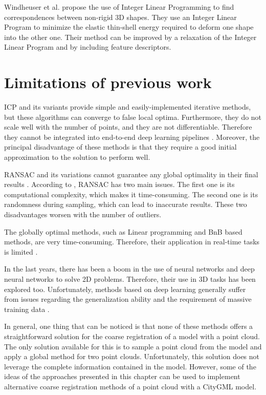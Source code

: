     Windheuser et al. \cite{Windheuser_2011_largescale} propose the use of Integer Linear Programming to find correspondences between non-rigid 3D shapes.
    They use an Integer Linear Program to minimize the elastic thin-shell energy required to deform one shape into the other one.
    Their method can be improved by a relaxation of the Integer Linear Program and by including feature descriptors.

    \section{Limitations of previous work} 

    ICP and its variants provide simple and easily-implemented iterative methods, but these algorithms can converge to false local optima.
    Furthermore, they do not scale well with the number of points, and they are not differentiable. 
    Therefore they cannot be integrated into end-to-end deep learning pipelines \cite{Sarode_2019_oneframework}. 
    Moreover, the principal disadvantage of these methods is that they require a good initial approximation to the solution to perform well.
    
    RANSAC and its variations cannot guarantee any global optimality in their final results \cite{Bazin_2013_abranchandbound}.
    According to \cite{Quan_2020_com}, RANSAC has two main issues. 
    The first one is its computational complexity, which makes it time-consuming.
    The second one is its randomness during sampling, which can lead to inaccurate results.
    These two disadvantages worsen with the number of outliers.

    The globally optimal methods, such as Linear programming and BnB based methods, are very time-consuming. 
    Therefore, their application in real-time tasks is limited \cite{Sarode_2019_oneframework}.

    In the last years, there has been a boom in the use of neural networks and deep neural networks to solve 2D problems.
    Therefore, their use in 3D tasks has been explored too.
    Unfortunately, methods based on deep learning generally suffer from issues regarding the generalization ability and the requirement of massive training data \cite{Quan_2020_com}.

    In general, one thing that can be noticed is that none of these methods offers a straightforward solution for the coarse registration of a model with a point cloud.
    The only solution available for this is to sample a point cloud from the model and apply a global method for two point clouds.
    Unfortunately, this solution does not leverage the complete information contained in the model.
    However, some of the ideas of the approaches presented in this chapter can be used to implement alternative coarse registration methods of a point cloud with a CityGML model.


